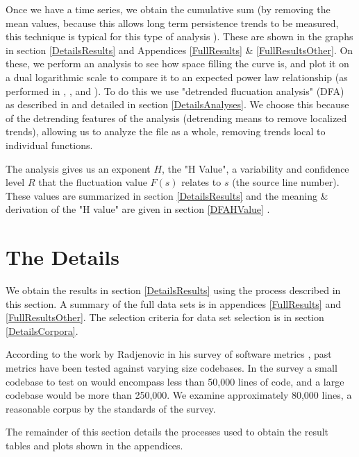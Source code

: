\documentclass[12pt]{article}
\begin{document}
Once we have a time series, we obtain the cumulative sum (by removing the mean values, because this allows long term persistence trends to be measured, this technique is typical for this type of analysis \cite{Suteanu:ArticWind:14, Suteanu:AirTemps:14}).  These are shown in the graphs in section \ref{DetailsResults} and Appendices \ref{FullResults} \& \ref{FullResultsOther}.  On these, we perform an analysis to see how space filling the curve is, and plot it on a dual logarithmic scale to compare it to an expected power law relationship (as performed in \cite{Kantelhardt:DFA:01}, \cite{Suteanu:AirTemps:14}, and \cite{Suteanu:ArticWind:14}).  To do this we use "detrended flucuation analysis" (DFA) as described in \cite{Kantelhardt:DFA:01} and detailed in section \ref{DetailsAnalyses}.  We choose this because of the detrending features of the analysis (detrending means to remove localized trends), allowing us to analyze the file as a whole, removing trends local to individual functions.  


The analysis gives us an exponent $H$, the "H Value", a variability and confidence level $R$ that the fluctuation value $F(s)$ relates to $s$ (the source line number).  These values are summarized in section \ref{DetailsResults} and the meaning \& derivation of the "H value" are given in section \ref{DFAHValue} .  


\section{The Details}
We obtain the results in section \ref{DetailsResults} using the process described in this section.  A summary of the full data sets is in appendices \ref{FullResults} and \ref{FullResultsOther}.  The selection criteria for data set selection is in section \ref{DetailsCorpora}.

According to the work by Radjenovic in his survey of software metrics \cite{Radjenovic:SoftwareMetrics:13}, past metrics have been tested against varying size codebases.  In the survey a small codebase to test on would encompass less than 50,000 lines of code, and a large codebase would be more than 250,000.  We examine approximately 80,000 lines, a reasonable corpus by the standards of the survey.

The remainder of this section details the processes used to obtain the result tables and plots shown in the appendices.
\end{document}
